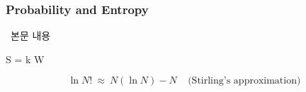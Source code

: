 \subsubsection{Probability and Entropy}
%
\ 본문 내용

\begin{eqbox} S = k \ln W ~~~~~ 
\label{eq:boltzmann's_entropy_equation} \end{eqbox}

\begin{equation} \ln N! ~ \approx ~ N (\ln N) - N ~~~~~ \text{(Stirling's approximation)} \end{equation}